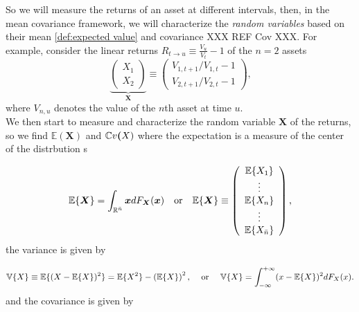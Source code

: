\documentclass{article}
\theoremstyle{definition}
\theoremstyle{remark}
\begin{document}
So we will measure the returns of 
an asset at different intervals, then, in 
the mean covariance framework, we will characterize 
the \textit{random variables} based on their mean \ref{def:expected value} and covariance XXX REF Cov XXX.
For example, consider the linear returns $
    R_{t\rightarrow u}\equiv\frac{V_{u}}{V_{t}}-1\text{}$ of the $n=2$ assets
\begin{equation}
    \underbrace{\left( \begin{smallmatrix}
    X_{1}\\
    X_{2}
    \end{smallmatrix} \right) }_{\boldsymbol{X}}\equiv\left( \begin{smallmatrix}
    V_{1,t+1}/V_{1,t}-1\\
    V_{2,t+1}/V_{2,t}-1
    \end{smallmatrix} \right) \text{,}
    \end{equation}
where $V_{n,u}$ denotes the value of the $n$th asset at time $u$. \\
\indent We then start to measure and characterize the random variable $\textbf{X}$ of the returns, so we
find $\mathbb{E}(\textbf{X})$ and $\mathbb{C}v{\textbf(X)}$ where the expectation is a measure of the center
of the distrbution s

\[
    \mathbb{E}\{\boldsymbol{X}\}=\int_{\mathbb{R}^{\bar{n}}}\boldsymbol{x}dF_{\boldsymbol{X}}(\boldsymbol{x}) \quad \textnormal{or} \quad 
        \mathbb{E}\{\boldsymbol{X}\}\equiv\left( \begin{array}
        [c]{c}\mathbb{E}\{X_{1}\}\\
        \vdots\\
        \mathbb{E}\{X_{n}\}\\
        \vdots\\
        \mathbb{E}\{X_{\bar{n}}\}
        \end{array} \right) \text{,}
\]
the variance is given by 

\[
    \mathbb{V}\{X\}\equiv\mathbb{E}\{(X-\mathbb{E}\{X\})^{2}\}=\mathbb{E}\{X^{2}\}-\left( \mathbb{E}\{X\}\right) ^{2}\text{,}
    \quad \textnormal{ or } \quad 
    \mathbb{V}\{X\}=\int\nolimits_{-\infty}^{+\infty}(x-\mathbb{E}\{X\})^{2}dF_{X}(x)\text{.}
\]
and the covariance is given by
\end{document}
